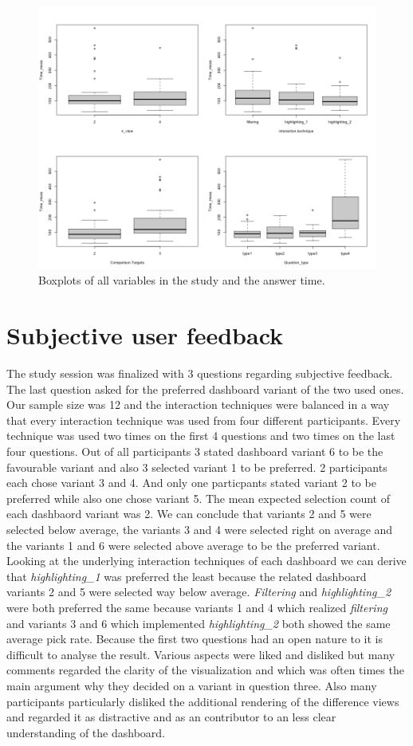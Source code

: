 \begin{figure}[ht]
    \centering
    \includegraphics[width=15.5cm]{images/boxplots.png}
    \caption{Boxplots of all variables in the study and the answer time.} \label{boxplotsStudyVariablesAnswerTimefigure}
\end{figure}

\section{Subjective user feedback}
The study session was finalized with 3 questions regarding subjective feedback. The last question asked for the preferred dashboard variant of the
two used ones. Our sample size was 12 and the interaction techniques were balanced in a way that every interaction technique was used from four different
participants. Every technique was used two times on the first 4 questions and two times on the last four questions. Out of all participants 3 stated dashboard
variant 6 to be the favourable variant and also 3 selected variant 1 to be preferred. 2 participants each chose variant 3 and 4. And only one particpants
stated variant 2 to be preferred while also one chose variant 5. The mean expected selection count of each dashbaord variant was 2. We can conclude that
variants 2 and 5 were selected below average, the variants 3 and 4 were selected right on average and the variants 1 and 6 were selected above average to be
the preferred variant. Looking at the underlying interaction techniques of each dashboard we can derive that \textit{highlighting\_1} was preferred the least
because the related dashboard variants 2 and 5 were selected way below average. \textit{Filtering} and \textit{highlighting\_2} were both preferred the same
because variants 1 and 4 which realized \textit{filtering} and variants 3 and 6 which implemented \textit{highlighting\_2} both showed the same average pick rate.
Because the first two questions had an open nature to it is difficult to analyse the result. Various aspects were liked and disliked but many comments
regarded the clarity of the visualization and which was often times the main argument why they decided on a variant in question three. Also many participants
particularly disliked the additional rendering of the difference views and regarded it as distractive and as an contributor to an less clear understanding of
the dashboard.